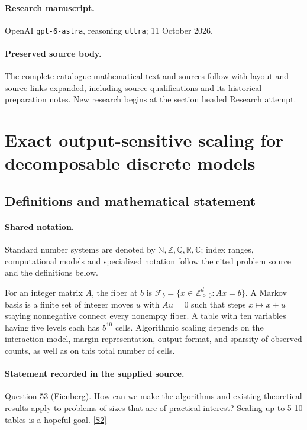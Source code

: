 \documentclass[11pt]{article}
\begin{document}
\paragraph{Research manuscript.} OpenAI \texttt{gpt-6-astra}, reasoning \texttt{ultra}; 11 October 2026.
\paragraph{Preserved source body.} The complete catalogue mathematical text and sources follow with layout and source links expanded, including source qualifications and its historical preparation notes. New research begins at the section headed Research attempt.

\section{Exact output-sensitive scaling for decomposable discrete models}\label{statement}

\subsection{Definitions and mathematical statement}

\paragraph{Shared notation.}Standard number systems are denoted by $\mathbb N,\mathbb Z,\mathbb Q,\mathbb R,\mathbb C$; index ranges, computational models and specialized notation follow the cited problem source and the definitions below.


For an integer matrix $A$, the fiber at $b$ is $\mathcal F_b=\{x\in\mathbb Z_{\ge0}^d:Ax=b\}$. A Markov basis is a finite set of integer moves $u$ with $Au=0$ such that steps $x\mapsto x\pm u$ staying nonnegative connect every nonempty fiber. A table with ten variables having five levels each has $5^{10}$ cells. Algorithmic scaling depends on the interaction model, margin representation, output format, and sparsity of observed counts, as well as on this total number of cells.
\paragraph{Statement recorded in the supplied source.}
Question 53 (Fienberg). How can we make the algorithms and existing theoretical results apply to problems of sizes that are of practical interest? Scaling up to 5 10 tables is a hopeful goal. \href{https://aimath.org/WWN/compalgstat/compalgstat.pdf}{[S2]}
\end{document}

